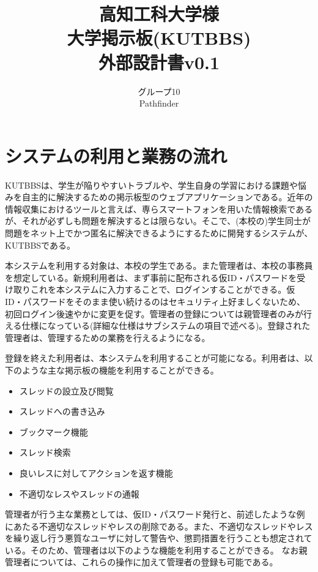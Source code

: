 \documentclass[a4j]{jarticle}
\title{
\vspace{30mm}
{\bf 高知工科大学様}
\\
\vspace{5mm}
大学掲示板(KUTBBS)\\
\vspace{5mm}
{\bf  外部設計書v0.1}
\vspace{90mm}
}
\author{
\vspace{5mm}
グループ10 \\
\vspace{5mm}
Pathfinder \\
\vspace{5mm}
\vspace{10mm}
}
\begin{document}
\maketitle
\tableofcontents
\newpage




\section{システムの利用と業務の流れ}
KUTBBSは、学生が陥りやすいトラブルや、学生自身の学習における課題や悩みを自主的に解決するための掲示板型のウェブアプリケーションである。近年の情報収集におけるツールと言えば、専らスマートフォンを用いた情報検索であるが、それが必ずしも問題を解決するとは限らない。そこで、(本校の)学生同士が問題をネット上でかつ匿名に解決できるようにするために開発するシステムが、KUTBBSである。



本システムを利用する対象は、本校の学生である。また管理者は、本校の事務員を想定している。新規利用者は、まず事前に配布される仮ID・パスワードを受け取りこれを本システムに入力することで、ログインすることができる。仮ID・パスワードをそのまま使い続けるのはセキュリティ上好ましくないため、初回ログイン後速やかに変更を促す。管理者の登録については親管理者のみが行える仕様になっている(詳細な仕様はサブシステムの項目で述べる)。登録された管理者は、管理するための業務を行えるようになる。


登録を終えた利用者は、本システムを利用することが可能になる。利用者は、以下のような主な掲示板の機能を利用することができる。
\begin{itemize}
  \item スレッドの設立及び閲覧
  \item スレッドへの書き込み
  \item ブックマーク機能
  \item スレッド検索
  \item 良いレスに対してアクションを返す機能
  \item 不適切なレスやスレッドの通報
\end{itemize}






管理者が行う主な業務としては、仮ID・パスワード発行と、前述したような例にあたる不適切なスレッドやレスの削除である。また、不適切なスレッドやレスを繰り返し行う悪質なユーザに対して警告や、懲罰措置を行うことも想定されている。そのため、管理者は以下のような機能を利用することができる。
なお親管理者については、これらの操作に加えて管理者の登録も可能である。
\end{document}
